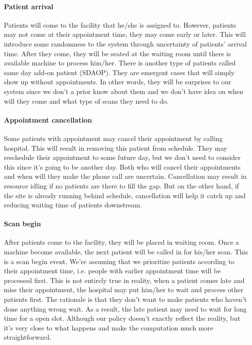 \paragraph{Patient arrival} Patients will come to the facility that he/she is assigned to. However, patients may not come at their appointment time, they may come early or later. This will introduce some randomness to the system through uncertainty of patients' arrival time. After they come, they will be seated at the waiting room until there is available machine to process him/her. There is another type of patients called same day add-on patient (SDAOP). They are emergent cases that will simply show up without appointments. In other words, they will be surprises to our system since we don't a prior know about them and we don't have idea on when will they come and what type of scans they need to do.

\paragraph{Appointment cancellation} Some patients with appointment may cancel their appointment by calling hospital. This will result in
removing this patient from schedule. They may reschedule their appointment to some future day, but we don't need to consider this since it's going to be another day. Both who will cancel their appointments and when will they make the phone call are uncertain. Cancellation may result in resource idling if no patients are there to fill the gap. But on the other hand, if the site is already running behind schedule, cancellation will help it catch up and reducing waiting time of patients downstream.

\paragraph{Scan begin} After patients come to the facility, they will be placed in waiting room. Once a machine become available, the next patient will be called in for his/her scan. This is a scan begin event. We're assuming that we prioritize patients according to their appointment time, i.e. people with earlier appointment time will be processed first. This is not entirely true in reality, when a patient comes late and miss their appointment, the hospital may put him/her to wait and process other patients first. The rationale is that they don't want to make patients who haven't done anything wrong wait. As a result, the late patient may need to wait for long time for a open slot. Although our policy doesn't exactly reflect the reality, but it's very close to what happens and make the computation much more straightforward.

